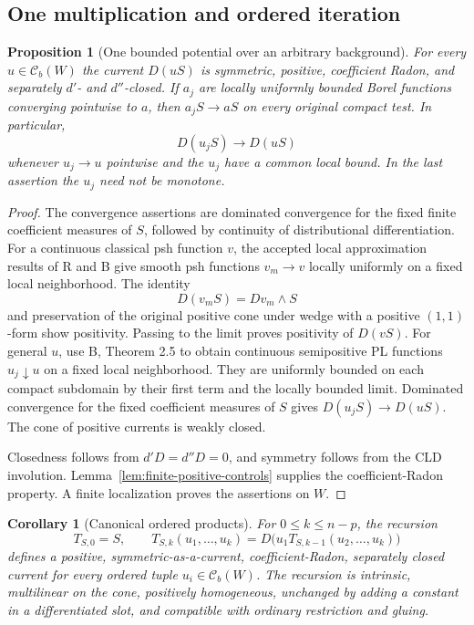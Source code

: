 \documentclass[11pt,a4paper]{article}
\numberwithin{equation}{section}
\newtheorem{proposition}[theorem]{Proposition}
\newtheorem{corollary}[theorem]{Corollary}
\theoremstyle{definition}
\theoremstyle{remark}
\begin{document}
\subsection{One multiplication and ordered iteration}

\begin{proposition}[One bounded potential over an arbitrary background]
\label{prop:one-potential-arbitrary-background}
For every $u\in\mathcal C_b(W)$ the current $D(uS)$ is symmetric,
positive, coefficient Radon, and separately $d'$- and $d''$-closed.
If $a_j$ are locally uniformly bounded Borel functions converging
pointwise to $a$, then $a_jS\to aS$ on every original compact test.
In particular,
\[
 D(u_jS)\longrightarrow D(uS)
\]
whenever $u_j\to u$ pointwise and the $u_j$ have a common local bound.
In the last assertion the $u_j$ need not be monotone.
\end{proposition}

\begin{proof}
The convergence assertions are dominated convergence for the fixed
finite coefficient measures of $S$, followed by continuity of
distributional differentiation. For a continuous classical psh
function $v$, the accepted local approximation results of R and B give
smooth psh functions $v_m\to v$ locally uniformly on a fixed local
neighborhood. The identity
\[
 D(v_mS)=Dv_m\wedge S
\]
and preservation of the original positive cone under wedge with a
positive $(1,1)$-form show positivity. Passing to the limit proves
positivity of $D(vS)$. For general $u$, use B, Theorem 2.5 to obtain
continuous semipositive PL functions $u_j\downarrow u$ on a fixed local
neighborhood. They are uniformly bounded on each compact subdomain by
their first term and the locally bounded limit. Dominated convergence
for the fixed coefficient measures of $S$ gives
$D(u_jS)\to D(uS)$. The cone of positive currents is weakly closed.

Closedness follows from $d'D=d''D=0$, and symmetry follows from the
CLD involution. Lemma~\ref{lem:finite-positive-controls} supplies the
coefficient-Radon property. A finite localization proves the assertions
on $W$.
\end{proof}

\begin{corollary}[Canonical ordered products]
\label{cor:ordered-arbitrary-background}
For $0\leq k\leq n-p$, the recursion
\[
 T_{S,0}=S,\qquad
 T_{S,k}(u_1,\ldots,u_k)
 =D\bigl(u_1T_{S,k-1}(u_2,\ldots,u_k)\bigr)
\]
defines a positive, symmetric-as-a-current, coefficient-Radon, separately
closed current for every ordered tuple $u_i\in\mathcal C_b(W)$.
The recursion is intrinsic, multilinear on the cone, positively
homogeneous, unchanged by adding a constant in a differentiated slot,
and compatible with ordinary restriction and gluing.
\end{corollary}
\end{document}
